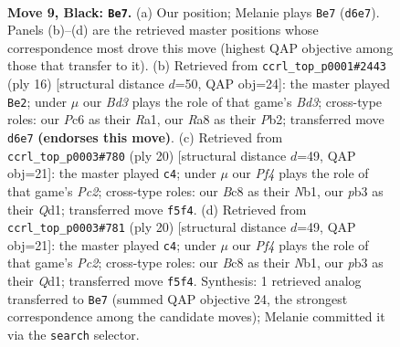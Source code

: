 \documentclass[11pt]{article}
\begin{document}
\clearpage

\begin{figure}[p]\centering
\begin{subfigure}{0.46\textwidth}\centering
\resizebox{\linewidth}{!}{%
\newchessgame
\chessboard[
  setfen={rnbq1rk1/pp4pp/2pb1n2/3p1p2/3P4/1P3NP1/P3PPBP/RNBQR1K1 b - - 1 9},
  showmover=false,
  pgfstyle=straightmove, color=movearrow, markmove={d6-e7}
]}
\caption{}
\end{subfigure}\hfill
\begin{subfigure}{0.46\textwidth}\centering
\resizebox{\linewidth}{!}{%
\newchessgame
\chessboard[
  setfen={r1bq1rk1/pp3ppp/2nppn2/8/1pPP4/3BPN2/PP3PPP/RN1Q1RK1 w - - 2 9},
  showmover=false,
  pgfstyle=straightmove, color=movearrow, markmove={d3-e2}
]}
\caption{}
\end{subfigure}
\\[4pt]
\begin{subfigure}{0.46\textwidth}\centering
\resizebox{\linewidth}{!}{%
\newchessgame
\chessboard[
  setfen={rnbq1rk1/pp3pbp/5np1/3p4/3Np3/1P4P1/PBP1PPBP/RN1Q1RK1 w - - 2 11},
  showmover=false,
  pgfstyle=straightmove, color=movearrow, markmove={c2-c4}
]}
\caption{}
\end{subfigure}\hfill
\begin{subfigure}{0.46\textwidth}\centering
\resizebox{\linewidth}{!}{%
\newchessgame
\chessboard[
  setfen={rnbq1rk1/pp3pbp/5np1/3p4/3Np3/1P4P1/PBP1PPBP/RN1Q1RK1 w - - 2 11},
  showmover=false,
  pgfstyle=straightmove, color=movearrow, markmove={c2-c4}
]}
\caption{}
\end{subfigure}
\caption{\textbf{Move 9, Black: \texttt{Be7}.} (a) Our position; Melanie plays \texttt{Be7} (\texttt{d6e7}). Panels (b)--(d) are the retrieved master positions whose correspondence most drove this move (highest QAP objective among those that transfer to it). (b) Retrieved from \texttt{ccrl\_top\_p0001\#2443} (ply 16) [structural distance $d$=50, QAP obj=24]: the master played \texttt{Be2}; under $\mu$ our \emph{Bd3} plays the role of that game's \emph{Bd3}; cross-type roles: our \emph{P}c6 as their \emph{R}a1, our \emph{R}a8 as their \emph{P}b2; transferred move \texttt{d6e7} \textbf{(endorses this move)}. (c) Retrieved from \texttt{ccrl\_top\_p0003\#780} (ply 20) [structural distance $d$=49, QAP obj=21]: the master played \texttt{c4}; under $\mu$ our \emph{Pf4} plays the role of that game's \emph{Pc2}; cross-type roles: our \emph{B}c8 as their \emph{N}b1, our \emph{p}b3 as their \emph{Q}d1; transferred move \texttt{f5f4}. (d) Retrieved from \texttt{ccrl\_top\_p0003\#781} (ply 20) [structural distance $d$=49, QAP obj=21]: the master played \texttt{c4}; under $\mu$ our \emph{Pf4} plays the role of that game's \emph{Pc2}; cross-type roles: our \emph{B}c8 as their \emph{N}b1, our \emph{p}b3 as their \emph{Q}d1; transferred move \texttt{f5f4}. Synthesis: 1 retrieved analog transferred to \texttt{Be7} (summed QAP objective 24, the strongest correspondence among the candidate moves); Melanie committed it via the \texttt{search} selector.}
\label{fig:thought-m17}
\end{figure}
\end{document}
